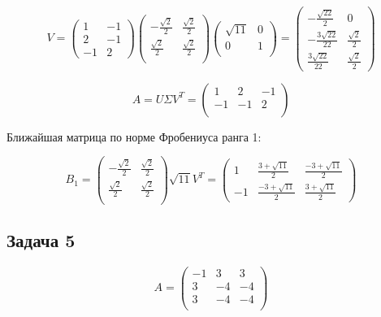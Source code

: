\documentclass[a4paper,12pt]{article}
\begin{document}
\[
V = \begin{pmatrix}
    1 & -1 \\
    2 & -1 \\
    -1 & 2 
\end{pmatrix} \begin{pmatrix}
    -\frac{\sqrt{2}}{2} & \frac{\sqrt{2}}{2} \\
    \frac{\sqrt{2}}{2} & \frac{\sqrt{2}}{2} \\
\end{pmatrix} \begin{pmatrix}
    \sqrt{11} & 0 \\
    0 & 1 \\
\end{pmatrix} = \begin{pmatrix}
    -\frac{\sqrt{22}}{2} & 0 \\
    -\frac{3\sqrt{22}}{22} & \frac{\sqrt{2}}{2} \\
    \frac{3\sqrt{22}}{22} & \frac{\sqrt{2}}{2}
\end{pmatrix}
\]

\[
A = U\Sigma V^T = \begin{pmatrix}
    1 & 2 & -1 \\
    -1 & -1 & 2 \\
\end{pmatrix}
\]

Ближайшая матрица по норме Фробениуса ранга 1:

\[
B_1 = \begin{pmatrix}
    -\frac{\sqrt{2}}{2} & \frac{\sqrt{2}}{2} \\
    \frac{\sqrt{2}}{2} & \frac{\sqrt{2}}{2} \\
\end{pmatrix} \sqrt{11} V^T = \begin{pmatrix}
    1 & \frac{3 + \sqrt{11}}{2} & \frac{-3 + \sqrt{11}}{2} \\
    -1 & \frac{-3 + \sqrt{11}}{2} & \frac{3 + \sqrt{11}}{2}
\end{pmatrix}
\]

\subsection{Задача 5}
\[
A = \begin{pmatrix}
    -1 & 3 & 3 \\
    3 & -4 & -4 \\
    3 & -4 & -4 \\
\end{pmatrix}
\]
\end{document}
